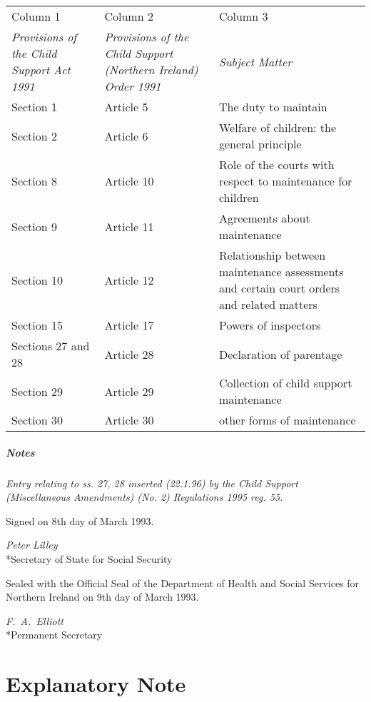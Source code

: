 \documentclass[a4paper]{article}
\newcommand\amendment[1]{\subsubsection*{Notes}{\itshape\frenchspacing\footnotesize #1 \par}}
\begin{document}
\noindent
\begin{tabulary}{\linewidth}{LJJ}
\hline
Column 1 & Column 2 & Column 3\\
\itshape Provisions of the Child Support Act 1991 & \itshape Provisions of the Child Support (Northern Ireland) Order 1991 & \itshape Subject Matter\\
\hline
Section 1&Article 5&The duty to maintain\\
Section 2&Article 6&Welfare of children: the general principle\\
Section 8&Article 10&Role of the courts with respect to maintenance for children\\
Section 9&Article 11&Agreements about maintenance\\
Section 10&Article 12&Relationship between maintenance assessments and certain court orders and related matters\\
Section 15&Article 17&Powers of inspectors\\
Sections 27 and 28 & Article 28 & Declaration of parentage\\ %
Section 29&Article 29&Collection of child support maintenance\\
Section 30&Article 30& other forms of maintenance\\
\hline
\end{tabulary}

\amendment{
Entry relating to ss. 27, 28 inserted (22.1.96) by the Child Support (Miscellaneous Amendments) (No. 2) Regulations 1995 reg. 55.
}

\bigskip

Signed on 8th day of March 1993.

{\raggedleft
\emph{Peter Lilley}\\*Secretary of State for Social Security

}

\bigskip

Sealed with the Official Seal of the Department of Health and Social Services for Northern Ireland on 9th day of March 1993.


{\raggedleft
\emph{F.\ A.\ Elliott}\\*Permanent Secretary

}

\part{Explanatory Note}
\end{document}
